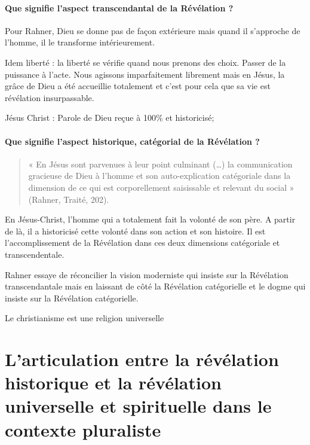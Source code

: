\paragraph{Que signifie l’aspect transcendantal de la Révélation ? }

Pour Rahner, Dieu se donne pas de façon extérieure mais quand il s'approche de l'homme, il le transforme intérieurement.

Idem liberté : la liberté se vérifie quand nous prenons des choix. Passer de la puissance à l'acte. Nous agissons imparfaitement librement mais en Jésus, la grâce de Dieu a été accueillie totalement et c'est pour cela que sa vie est révélation insurpassable.
 
Jésus Christ : Parole de Dieu reçue à 100\% et historicisé;



\paragraph{Que signifie l’aspect historique, catégorial de la Révélation ? }
\begin{quote}
    « En Jésus sont parvenues à leur point culminant (…) la communication gracieuse de Dieu à l’homme et son auto-explication catégoriale dans la dimension de ce qui est corporellement saisissable et relevant du social » (Rahner, Traité, 202). 
\end{quote}

En Jésus-Christ, l'homme qui a totalement fait la volonté de son père. A partir de là, il a historicisé cette volonté dans son action et son histoire. Il est l'accomplissement de la Révélation dans ces deux dimensions catégoriale et transcendentale.



\begin{Synthesis}
Rahner essaye de réconcilier la vision moderniste qui insiste sur la Révélation transcendantale mais en laissant de côté la Révélation catégorielle et le dogme qui insiste sur la Révélation catégorielle. 
\end{Synthesis}
Le christianisme est une religion universelle


\section{L’articulation entre la révélation historique et la révélation universelle et spirituelle dans le contexte pluraliste}


